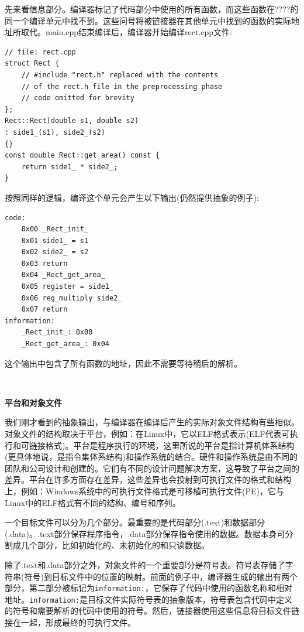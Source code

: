 先来看信息部分。编译器标记了代码部分中使用的所有函数，而这些函数在????的同一个编译单元中找不到。这些问号将被链接器在其他单元中找到的函数的实际地址所取代。main.cpp结束编译后，编译器开始编译rect.cpp文件: \par

\begin{lstlisting}[caption={}]
// file: rect.cpp
struct Rect {
	// #include "rect.h" replaced with the contents
	// of the rect.h file in the preprocessing phase
	// code omitted for brevity
};
Rect::Rect(double s1, double s2)
: side1_(s1), side2_(s2)
{}
const double Rect::get_area() const {
	return side1_ * side2_;
}
\end{lstlisting}

按照同样的逻辑，编译这个单元会产生以下输出(仍然提供抽象的例子): \par

\begin{lstlisting}[caption={}]
code:
	0x00 _Rect_init_
	0x01 side1_ = s1
	0x02 side2_ = s2
	0x03 return
	0x04 _Rect_get_area_
	0x05 register = side1_
	0x06 reg_multiply side2_
	0x07 return
information:
	_Rect_init_: 0x00
	_Rect_get_area_: 0x04
\end{lstlisting}

这个输出中包含了所有函数的地址，因此不需要等待稍后的解析。\par

\noindent\textbf{}\ \par
\textbf{平台和对象文件}\ \par
我们刚才看到的抽象输出，与编译器在编译后产生的实际对象文件结构有些相似。对象文件的结构取决于平台，例如：在Linux中，它以ELF格式表示(ELF代表可执行和可链接格式)。平台是程序执行的环境，这里所说的平台是指计算机体系结构(更具体地说，是指令集体系结构)和操作系统的结合。硬件和操作系统是由不同的团队和公司设计和创建的。它们有不同的设计问题解决方案，这导致了平台之间的差异。平台在许多方面存在差异，这些差异也会投射到可执行文件的格式和结构上，例如：Windows系统中的可执行文件格式是可移植可执行文件(PE)，它与Linux中的ELF格式有不同的结构、编号和序列。 \par
一个目标文件可以分为几个部分。最重要的是代码部分(.text)和数据部分(.data)。.text部分保存程序指令，.data部分保存指令使用的数据。数据本身可分割成几个部分，比如初始化的、未初始化的和只读数据。 \par
除了.text和.data部分之外，对象文件的一个重要部分是符号表。符号表存储了字符串(符号)到目标文件中的位置的映射。前面的例子中，编译器生成的输出有两个部分，第二部分被标记为\texttt{information:}，它保存了代码中使用的函数名称和相对地址。\texttt{information:}是目标文件实际符号表的抽象版本，符号表包含代码中定义的符号和需要解析的代码中使用的符号。然后，链接器使用这些信息将目标文件链接在一起，形成最终的可执行文件。 \par

